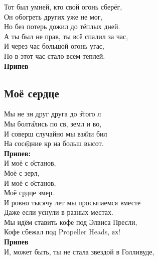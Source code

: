 \documentclass[fleqn,a5paper,12pt,twoside]{guitartabs}
\newcommand{\musVspace}{\vspace{2mm}}
\begin{document}
    Тот был умней, кто свой огонь сберёг, \\
    Он обогреть других уже не мог, \\
    Но без потерь дожил до тёплых дней. \\
    А ты был не прав, ты всё спалил за час, \\
    И через час большой огонь угас, \\
    Но в этот час стало всем теплей.\\
    
    \-\hspace{10mm}\textbf{Припев}\\
\newpage
{}%
\subsection*{Моё сердце}
    \vspace{-4mm}
    Мы не зн друг друга до \G{этого} л\\
    Мы болт\G{ались} по св, земл и во,\\
    И соверш случайно мы вз\G{яли} бил\\
    На сос\G{едние} кр на больш высот.\musVspace\\
    \-\hspace{10mm}\textbf{Припев:}\vspace{-2mm}\\
    \-\hspace{10mm}И моё с \G{о}станов,\\
    \-\hspace{10mm}Моё с зерл,\\
    \-\hspace{10mm}И моё с \G{о}станов,\\
    \-\hspace{10mm}Моё срдце змер.\musVspace\\
    И ровно тысячу лет мы просыпаемся вместе\\
    Даже если уснули в разных местах.  \\
    Мы идём ставить кофе под Элвиса Пресли,\\
    Кофе сбежал под Propeller Heads, ах!\\
    \-\hspace{10mm}\textbf{Припев}\\
    И, может быть, ты не стала звездой в Голливуде,\\
\end{document}
